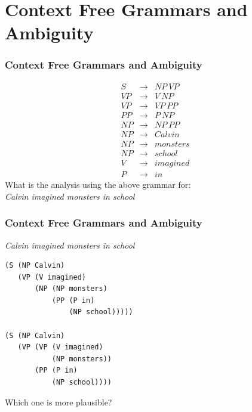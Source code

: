 
\ifx\pdfoutput\undefined
  \usepackage{graphicx}
\else
\fi
\newcommand{\argmax}[1]{\begin{array}{c}\mbox{arg max}\\#1\end{array}}



\section{Context Free Grammars and Ambiguity}

\begin{frame}[fragile]
\frametitle{Context Free Grammars and Ambiguity}
\[
\begin{array}{ccc}
 S & \rightarrow & NP~VP  \\
 VP & \rightarrow & V~NP   \\
 VP & \rightarrow & VP~PP \\
 PP & \rightarrow & P~NP   \\
 NP & \rightarrow & NP~PP  \\
 NP & \rightarrow & Calvin  \\
 NP & \rightarrow & monsters  \\
 NP & \rightarrow & school  \\
 V & \rightarrow & imagined \\
 P & \rightarrow & in     
\end{array}
\]
What is the analysis using the above grammar for:\\
{\em Calvin imagined monsters in school}
\end{frame}

\begin{frame}[fragile]
\frametitle{Context Free Grammars and Ambiguity}
{\em Calvin imagined monsters in school}
\begin{verbatim}
(S (NP Calvin)
   (VP (V imagined)
       (NP (NP monsters)
           (PP (P in)
               (NP school)))))

(S (NP Calvin)
   (VP (VP (V imagined)
           (NP monsters))
       (PP (P in)
           (NP school))))
\end{verbatim}
Which one is more plausible?
\end{frame}

